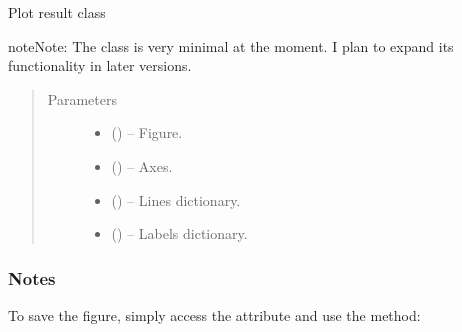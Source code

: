 \documentclass[letterpaper,10pt,english]{sphinxmanual}
\begin{document}
\begin{fulllineitems}
\label{\detokenize{references/plot:nmrespy.plot.NmrespyPlot}}
\sphinxAtStartPar
Plot result class

\begin{sphinxadmonition}{note}{Note:}
\sphinxAtStartPar
The class is very minimal at the moment. I plan to expand its
functionality in later versions.
\end{sphinxadmonition}
\begin{quote}\begin{description}
\item[{Parameters}] \leavevmode\begin{itemize}
\item {} 
\sphinxAtStartPar
{} () – Figure.

\item {} 
\sphinxAtStartPar
{} () – Axes.

\item {} 
\sphinxAtStartPar
{} () – Lines dictionary.

\item {} 
\sphinxAtStartPar
{} () – Labels dictionary.

\end{itemize}

\end{description}\end{quote}
\subsubsection*{Notes}

\sphinxAtStartPar
To save the figure, simply access the  attribute and use the
 method:


\end{fulllineitems}
\end{document}
